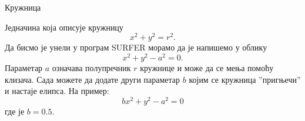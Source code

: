 ﻿\documentclass[en]{./../../common/SurferDesc}%
\begin{document}
\footnotesize
%


\begin{surferPage}
  \begin{surferTitle}Кружница\end{surferTitle}
   \begin{surferText}
   
Једначина која описује кружницу 
\[x^2+y^2=r^2.\]
Да бисмо је унели у програм SURFER морамо да је напишемо у облику
\[x^2+y^2-a^2=0.\]
Параметар $a$ означава полупречник $r$ кружнице и може да се мења помоћу клизача. Сада можете да додате други параметар $b$ којим се кружница ''пригњечи'' и настаје елипса. На пример:
\[bx^2+y^2-a^2=0\] где је $b=0.5$.


     \end{surferText}
\end{surferPage}
\end{document}
